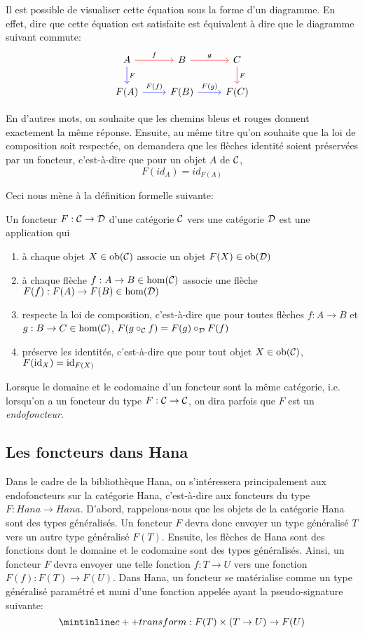 Il est possible de visualiser cette équation sous la forme d'un diagramme.
En effet, dire que cette équation est satisfaite est équivalent à dire que
le diagramme suivant commute:
\[
\begin{tikzcd}
    A \arrow[r, red, "f" black] \arrow[d, blue, "F" black] & B \arrow[r, red, "g" black] & C \arrow[d, red, "F" black] \\
    F(A) \arrow[r, blue, "F(f)" black] & F(B) \arrow[r, blue, "F(g)" black] & F(C)
\end{tikzcd}
\]

En d'autres mots, on souhaite que les chemins bleus et rouges donnent
exactement la même réponse. Ensuite, au même titre qu'on souhaite que la loi
de composition soit respectée, on demandera que les flèches identité soient
préservées par un foncteur, c'est-à-dire que pour un objet $A$ de $\mathcal{C}$,
\[
    F(id_A) = id_{F(A)}
\]

Ceci nous mène à la définition formelle suivante:

\begin{définition}[Foncteur]
    Un foncteur $F : \mathcal{C} \to \mathcal{D}$ d'une catégorie $\mathcal{C}$ vers une catégorie $\mathcal{D}$
    est une application qui
    \begin{enumerate}
        \item à chaque objet $X \in \mathrm{ob}(\mathcal{C})$ associe un objet $F(X) \in \mathrm{ob}(\mathcal{D})$
        \item à chaque flèche $f : A \to B \in \hom(\mathcal{C})$ associe une flèche
              $F(f) : F(A) \to F(B) \in \hom(\mathcal{D})$
        \item respecte la loi de composition, c'est-à-dire que pour toutes
              flèches $f : A \to B$ et $g : B \to C \in \hom(\mathcal{C})$,
              $F(g \circ_{\mathcal{C}} f) = F(g) \circ_{\mathcal{D}} F(f)$
        \item préserve les identités, c'est-à-dire que pour tout objet
              $X \in \mathrm{ob}(\mathcal{C})$, $F(\mathrm{id}_X) = \mathrm{id}_{F(X)}$
    \end{enumerate}
\end{définition}

Lorsque le domaine et le codomaine d'un foncteur sont la même catégorie, i.e.
lorsqu'on a un foncteur du type $F : \mathcal{C} \to \mathcal{C}$, on dira parfois que $F$ est
un \textit{endofoncteur}.


\subsection{Les foncteurs dans Hana}
Dans le cadre de la bibliothèque Hana, on s'intéressera principalement aux
endofoncteurs sur la catégorie Hana, c'est-à-dire aux foncteurs du type
$F : Hana \to Hana$. D'abord, rappelons-nous que les objets de la catégorie
Hana sont des types généralisés. Un foncteur $F$ devra donc envoyer un type
généralisé $T$ vers un autre type généralisé $F(T)$. Ensuite, les flèches de
Hana sont des fonctions dont le domaine et le codomaine sont des types
généralisés. Ainsi, un foncteur $F$ devra envoyer une telle fonction
$f : T \to U$ vers une fonction $F(f) : F(T) \to F(U)$. Dans Hana, un
foncteur se matérialise comme un type généralisé paramétré et muni d'une
fonction appelée  ayant la pseudo-signature suivante:
\[
    \icpp{transform} : F(T) \times (T \to U) \to F(U)
\]

